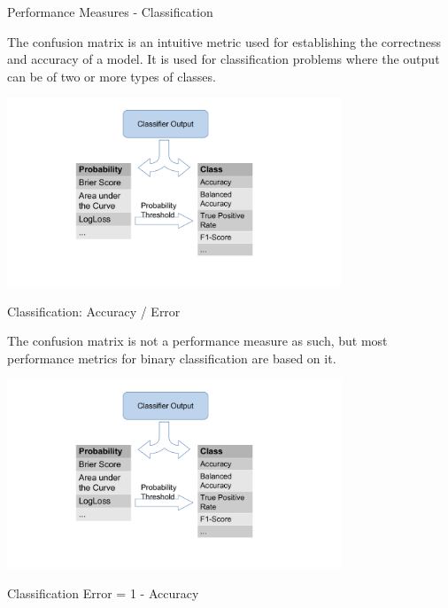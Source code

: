 \begin{frame}{Performance Measures - Classification}

The confusion matrix is an intuitive metric used for establishing the
correctness and accuracy of a model. It is used for classification
problems where the output can be of two or more types of classes.
\newline
\begin{centering}
\includegraphics[width=10cm,page=3]{plots/confusion_matrix_measures.pdf}
\end{centering}

\end{frame}

\begin{frame}{Classification: Accuracy / Error}

The confusion matrix is not a performance measure as such, but most
performance metrics for binary classification are based on it.
\newline
\begin{centering}
\includegraphics[width=10cm,page=4]{plots/confusion_matrix_measures.pdf}
\end{centering}

Classification Error = 1 - Accuracy

\end{frame}


